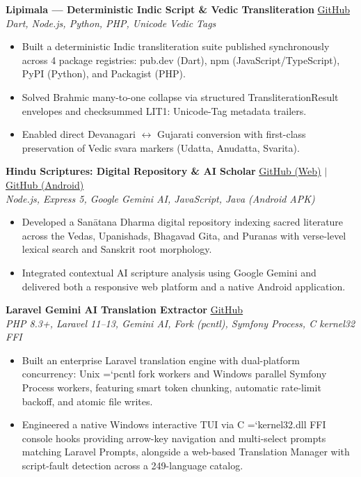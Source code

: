 \documentclass[11pt,a4paper]{article}
\newcommand{\cvlink}[2]{\textcolor{linkblue}{\underline{\href{#1}{#2}}}}
\renewcommand{\texttt}[1]{{\ttfamily\hyphenchar\font=`\-\relax #1}}
\newcommand{\projectheader}[3]{%
    \noindent\textbf{#1} \hfill #3 \\
    {\small\itshape #2}\par
    \vspace{2pt}
}
\begin{document}
\begin{adjustwidth}{0.25in}{0.25in}
\projectheader{Lipimala — Deterministic Indic Script \& Vedic Transliteration}{Dart, Node.js, Python, PHP, Unicode Vedic Tags}{%
  \cvlink{https://github.com/jayeshmepani/indic-script-converter}{GitHub}}
\begin{itemize}[leftmargin=0.2in, itemsep=1pt, parsep=0pt, topsep=0pt]
\item Built a deterministic Indic transliteration suite published synchronously across 4 package registries: pub.dev (Dart), npm (JavaScript/TypeScript), PyPI (Python), and Packagist (PHP).
\item Solved Brahmic many-to-one collapse via structured TransliterationResult envelopes and checksummed LIT1: Unicode-Tag metadata trailers.
\item Enabled direct Devanagari $\leftrightarrow$ Gujarati conversion with first-class preservation of Vedic svara markers (Udatta, Anudatta, Svarita).
\end{itemize}

\vspace{6pt}

\projectheader{Hindu Scriptures: Digital Repository \& AI Scholar}{Node.js, Express 5, Google Gemini AI, JavaScript, Java (Android APK)}{%
  \cvlink{https://github.com/jayeshmepani/HinduScriptures/}{GitHub (Web)} \;$|$\;
  \cvlink{https://github.com/jayeshmepani/hindu-scripture-apk}{GitHub (Android)}}
\begin{itemize}[leftmargin=0.2in, itemsep=1pt, parsep=0pt, topsep=0pt]
\item Developed a San\=atana Dharma digital repository indexing sacred literature across the Vedas, Upanishads, Bhagavad Gita, and Puranas with verse-level lexical search and Sanskrit root morphology.
\item Integrated contextual AI scripture analysis using Google Gemini and delivered both a responsive web platform and a native Android application.
\end{itemize}

\vspace{6pt}

\projectheader{Laravel Gemini AI Translation Extractor}{PHP 8.3+, Laravel 11--13, Gemini AI, Fork (pcntl), Symfony Process, C kernel32 FFI}{%
  \cvlink{https://github.com/jayeshmepani/laravel-gemini-translator}{GitHub}}
\begin{itemize}[leftmargin=0.2in, itemsep=1pt, parsep=0pt, topsep=0pt]
\item Built an enterprise Laravel translation engine with dual-platform concurrency: Unix \texttt{pcntl} fork workers and Windows parallel Symfony Process workers, featuring smart token chunking, automatic rate-limit backoff, and atomic file writes.
\item Engineered a native Windows interactive TUI via C \texttt{kernel32.dll} FFI console hooks providing arrow-key navigation and multi-select prompts matching Laravel Prompts, alongside a web-based Translation Manager with script-fault detection across a 249-language catalog.
\end{itemize}


\end{adjustwidth}
\end{document}
